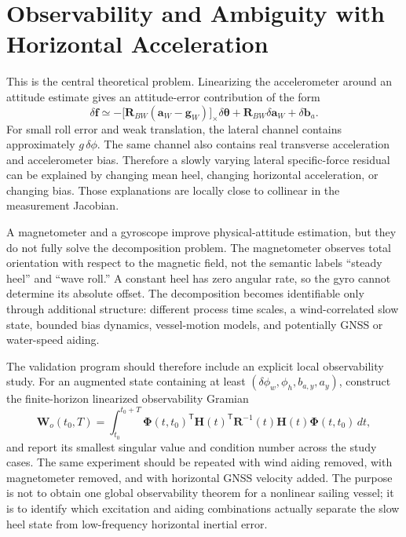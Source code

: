 \documentclass[conference]{IEEEtran}
\DeclareRobustCommand{\vct}[1]{\bm{#1}}
\DeclareRobustCommand{\mat}[1]{\bm{#1}}
\newcommand{\T}{^{\mathsf T}}
\begin{document}
\section{Observability and Ambiguity with Horizontal Acceleration}
\label{sec:observability}

This is the central theoretical problem. Linearizing the accelerometer around an attitude
estimate gives an attitude-error contribution of the form
\begin{equation}
 \delta\vct f
 \simeq -\big[\mat R_{BW}(\vct a_W-\vct g_W)\big]_\times
 \delta\vct\theta
 +\mat R_{BW}\delta\vct a_W+\delta\vct b_a.
 \label{eq:acc-linearized}
\end{equation}
For small roll error and weak translation, the lateral channel contains approximately
$g\,\delta\phi$. The same channel also contains real transverse acceleration and
accelerometer bias. Therefore a slowly varying lateral specific-force residual can be
explained by changing mean heel, changing horizontal acceleration, or changing bias.
Those explanations are locally close to collinear in the measurement Jacobian.

A magnetometer and a gyroscope improve physical-attitude estimation, but they do not
fully solve the decomposition problem. The magnetometer observes total orientation with
respect to the magnetic field, not the semantic labels ``steady heel'' and ``wave roll.''
A constant heel has zero angular rate, so the gyro cannot determine its absolute offset.
The decomposition becomes identifiable only through additional structure: different
process time scales, a wind-correlated slow state, bounded bias dynamics, vessel-motion
models, and potentially GNSS or water-speed aiding.

The validation program should therefore include an explicit local observability study.
For an augmented state containing at least $(\delta\phi_w,\phi_h,b_{a,y},a_y)$, construct
the finite-horizon linearized observability Gramian
\begin{equation}
 \mat W_o(t_0,T)=
 \int_{t_0}^{t_0+T}
 \mat\Phi(t,t_0)\T\mat H(t)\T\mat R^{-1}(t)
 \mat H(t)\mat\Phi(t,t_0)\,dt,
 \label{eq:gramian}
\end{equation}
and report its smallest singular value and condition number across the study cases. The
same experiment should be repeated with wind aiding removed, with magnetometer removed,
and with horizontal GNSS velocity added. The purpose is not to obtain one global
observability theorem for a nonlinear sailing vessel; it is to identify which excitation
and aiding combinations actually separate the slow heel state from low-frequency
horizontal inertial error.
\end{document}
